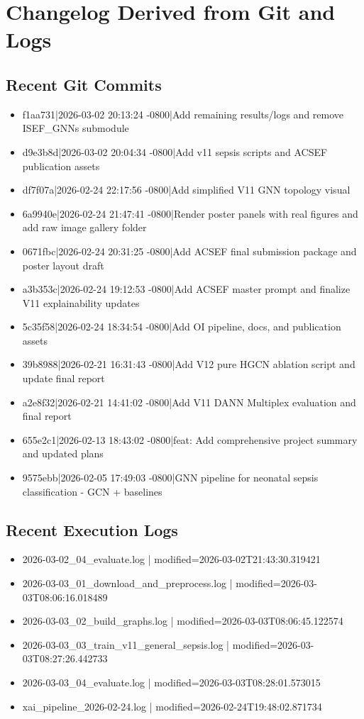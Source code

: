 \documentclass[11pt]{article}
\begin{document}
\section{Changelog Derived from Git and Logs}
\subsection{Recent Git Commits}
\begin{itemize}
\item f1aa731|2026-03-02 20:13:24 -0800|Add remaining results/logs and remove ISEF\_GNNs submodule
\item d9e3b8d|2026-03-02 20:04:34 -0800|Add v11 sepsis scripts and ACSEF publication assets
\item df7f07a|2026-02-24 22:17:56 -0800|Add simplified V11 GNN topology visual
\item 6a9940e|2026-02-24 21:47:41 -0800|Render poster panels with real figures and add raw image gallery folder
\item 0671fbc|2026-02-24 20:31:25 -0800|Add ACSEF final submission package and poster layout draft
\item a3b353c|2026-02-24 19:12:53 -0800|Add ACSEF master prompt and finalize V11 explainability updates
\item 5c35f58|2026-02-24 18:34:54 -0800|Add OI pipeline, docs, and publication assets
\item 39b8988|2026-02-21 16:31:43 -0800|Add V12 pure HGCN ablation script and update final report
\item a2e8f32|2026-02-21 14:41:02 -0800|Add V11 DANN Multiplex evaluation and final report
\item 655e2c1|2026-02-13 18:43:02 -0800|feat: Add comprehensive project summary and updated plans
\item 9575ebb|2026-02-05 17:49:03 -0800|GNN pipeline for neonatal sepsis classification - GCN + baselines
\end{itemize}
\subsection{Recent Execution Logs}
\begin{itemize}
\item 2026-03-02\_04\_evaluate.log | modified=2026-03-02T21:43:30.319421
\item 2026-03-03\_01\_download\_and\_preprocess.log | modified=2026-03-03T08:06:16.018489
\item 2026-03-03\_02\_build\_graphs.log | modified=2026-03-03T08:06:45.122574
\item 2026-03-03\_03\_train\_v11\_general\_sepsis.log | modified=2026-03-03T08:27:26.442733
\item 2026-03-03\_04\_evaluate.log | modified=2026-03-03T08:28:01.573015
\item xai\_pipeline\_2026-02-24.log | modified=2026-02-24T19:48:02.871734
\end{itemize}
\end{document}
